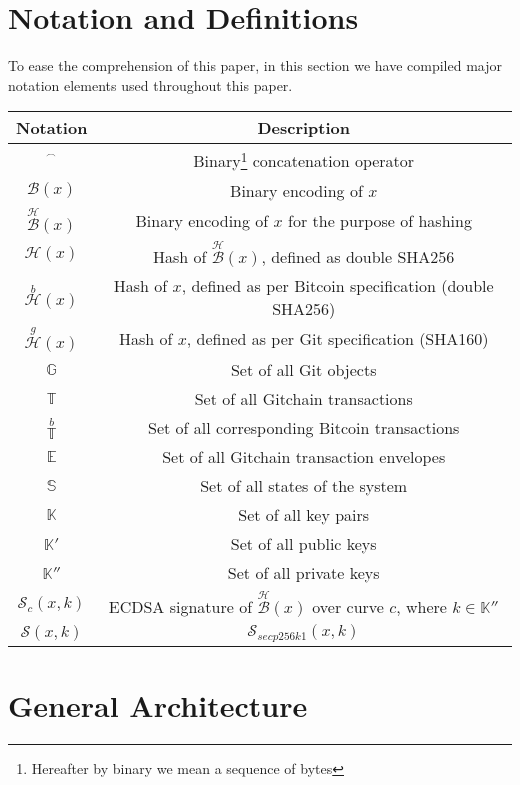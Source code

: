 \documentclass[a4paper]{article}
\newcommand{\concatA}{%
  \mathbin{\raisebox{1ex}{\scalebox{.7}{$\frown$}}}%
}
\newcommand{\Gbin}{\mathcal{B}}
\newcommand{\Gbinhash}{\overset{\mathcal{H}}{\mathcal{B}}}
\newcommand{\Ghash}{\mathcal{H}}
\newcommand{\Gbitcoinhash}{\overset{b}{\mathcal{H}}}
\newcommand{\Ggithash}{\overset{g}{\mathcal{H}}}
\newcommand{\Ggitobject}{\mathbb{G}}
\newcommand{\Gtxs}{\mathbb{T}}
\newcommand{\Gbitcointxs}{\overset{b}{\mathbb{T}}}
\newcommand{\Genvs}{\mathbb{E}}
\newcommand{\Gstates}{\mathbb{S}}
\newcommand{\Gkeypairs}{\mathbb{K}}
\newcommand{\Gpubkeys}{\mathbb{K}{'}}
\newcommand{\Gprivkeys}{\mathbb{K}{''}}
\newcommand{\Gsigc}[1]{\mathcal{S}_{#1}}
\newcommand{\Gsig}{\mathcal{S}}
\begin{document}
\section{Notation and Definitions}

To ease the comprehension of this paper, in this section we have compiled major notation elements used throughout this paper.

\begin{center}
\begin{tabu}{|c|c|}
\hline
\textbf{Notation} & \textbf{Description}\\ \hline
$\concatA$ & Binary\footnote{Hereafter by binary we mean a sequence of bytes} concatenation operator\\ \hline
$\Gbin(x)$ & Binary encoding of $x$\\ \hline
$\Gbinhash(x)$ & Binary encoding of $x$ for the purpose of hashing\\ \hline
$\Ghash(x)$ & Hash of $\Gbinhash(x)$, defined as double SHA256\\ \hline
$\Gbitcoinhash(x)$ & Hash of $x$, defined as per Bitcoin specification (double SHA256)\\ \hline
$\Ggithash(x)$ & Hash of $x$, defined as per Git specification (SHA160)\\ \hline
$\Ggitobject$ & Set of all Git objects \\ \hline
$\Gtxs$ & Set of all Gitchain transactions \\ \hline
$\Gbitcointxs$ & Set of all corresponding Bitcoin transactions \\ \hline
$\Genvs$ & Set of all Gitchain transaction envelopes \\ \hline
$\Gstates$ & Set of all states of the system\\ \hline
$\Gkeypairs$ & Set of all key pairs \\ \hline
$\Gpubkeys$ & Set of all public keys \\ \hline
$\Gprivkeys$ & Set of all private keys \\ \hline
$\Gsigc{c}(x, k)$ & ECDSA signature of $\Gbinhash(x)$ over curve $c$, where $k \in \Gprivkeys$  \\ \hline
$\Gsig(x, k)$ & $\Gsigc{secp256k1}(x, k)$ \\ \hline
\end{tabu}
\end{center}

\section{General Architecture}
\end{document}
